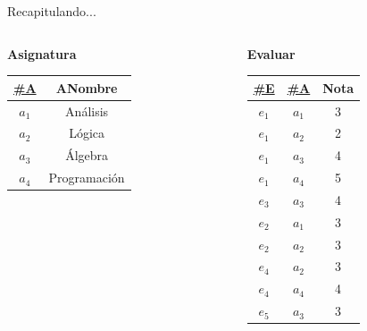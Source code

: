 \begin{frame}{Recapitulando...}
\begin{columns}[T]
\begin{column}{0.68\linewidth}
\begin{columns}[T]
            \end{columns}

            \begin{center}
                \textbf{Asignatura}\\[2mm]

                \begin{tabular}{cc}
                    \underline{\#A} & ANombre\\[1mm]
                    \hline
                    $a_1$ & An\'alisis\\
                    $a_2$ & L\'ogica \\
                    $a_3$ & \'Algebra\\
                    $a_4$ & Programaci\'on
                    
                \end{tabular}
            \end{center}
            
        \end{column}

        \begin{column}{0.3\linewidth}
            \vspace{6mm}
            \begin{center}
                \textbf{Evaluar}\\[2mm]

                \begin{tabular}{ccc}
                    \underline{\#E} & \underline{\#A} & Nota\\[1mm]
                    \hline
                    $e_1$ & $a_1$ & 3\\
                    $e_1$ & $a_2$ & 2\\
                    $e_1$ & $a_3$ & 4\\
                    $e_1$ & $a_4$ & 5\\
                    $e_3$ & $a_3$ & 4\\
                    $e_2$ & $a_1$ & 3\\
                    $e_2$ & $a_2$ & 3\\
                    $e_4$ & $a_2$ & 3\\
                    $e_4$ & $a_4$ & 4\\
                    $e_5$ & $a_3$ & 3\\
                \end{tabular}
            \end{center}
        \end{column}
    \end{columns}
    
\end{frame}


